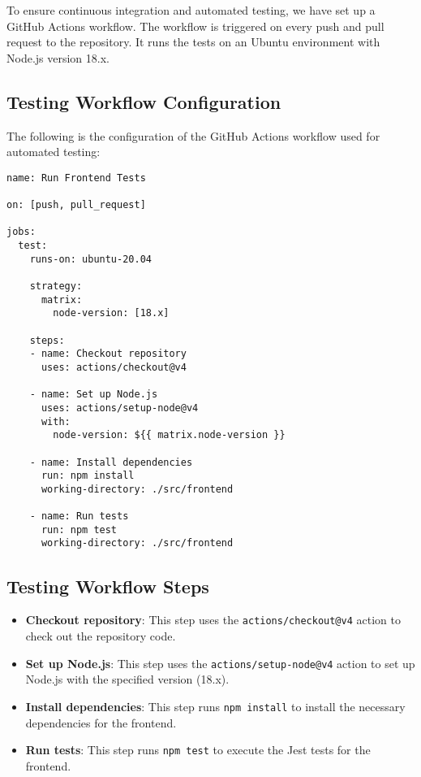 \documentclass[12pt, titlepage]{article}
\begin{document}
To ensure continuous integration and automated testing, we have set up a GitHub Actions workflow. The workflow is triggered on every push and pull request to the repository. It runs the tests on an Ubuntu environment with Node.js version 18.x.

\subsection{Testing Workflow Configuration}

The following is the configuration of the GitHub Actions workflow used for automated testing:

\begin{verbatim}
name: Run Frontend Tests

on: [push, pull_request]

jobs:
  test:
    runs-on: ubuntu-20.04

    strategy:
      matrix:
        node-version: [18.x]

    steps:
    - name: Checkout repository
      uses: actions/checkout@v4

    - name: Set up Node.js
      uses: actions/setup-node@v4
      with:
        node-version: ${{ matrix.node-version }}

    - name: Install dependencies
      run: npm install
      working-directory: ./src/frontend

    - name: Run tests
      run: npm test
      working-directory: ./src/frontend
\end{verbatim}

\subsection{Testing Workflow Steps}

\begin{itemize}
    \item \textbf{Checkout repository}: This step uses the \texttt{actions/checkout@v4} action to check out the repository code.
    \item \textbf{Set up Node.js}: This step uses the \texttt{actions/setup-node@v4} action to set up Node.js with the specified version (18.x).
    \item \textbf{Install dependencies}: This step runs \texttt{npm install} to install the necessary dependencies for the frontend.
    \item \textbf{Run tests}: This step runs \texttt{npm test} to execute the Jest tests for the frontend.
\end{itemize}
\end{document}
